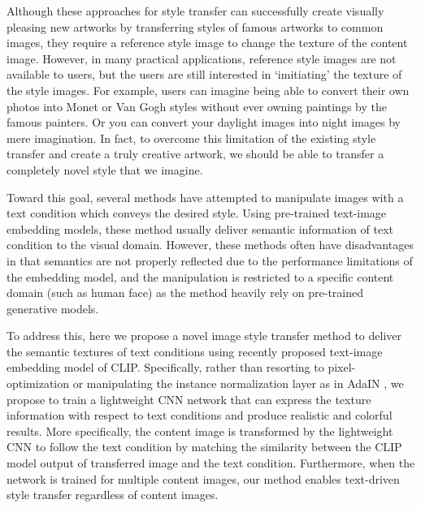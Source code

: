 \documentclass[10pt,twocolumn,letterpaper]{article}
\begin{document}
Although these approaches for style transfer can successfully create visually pleasing new artworks by transferring styles of famous artworks to common images,
they require a reference style image to change the texture of the content image. 
However, in many practical applications, reference style images are not available to users, but the users are still interested in `imitiating' the texture of the style images.
For example, users can imagine being able to convert their own photos into Monet or Van Gogh styles without ever owning paintings by the famous painters.
Or you can convert your daylight images into night images by mere imagination.
In fact,  to overcome this limitation of the existing style transfer and create a truly creative artwork, we should be able to transfer a completely novel style that we imagine.


Toward this goal, several methods have attempted to manipulate images with a text condition which conveys the desired style. Using pre-trained text-image embedding models, 
these method usually deliver semantic information of text condition  to the visual domain. However, these methods often have disadvantages in that semantics are not properly reflected due to the performance limitations of the embedding model\cite{zhang1,zhang2}, and the manipulation
is restricted to a specific content domain (such as human face) as the method heavily rely on pre-trained generative models\cite{styleclip}.

To address this, here we propose a novel image style transfer method to deliver the semantic textures of text conditions using recently proposed text-image embedding model of CLIP\cite{clip}. 
Specifically, rather than resorting to pixel-optimization or manipulating the instance normalization layer as in AdaIN \cite{adain},
we propose to train a lightweight CNN network that can express the texture information with respect to text conditions and produce realistic and colorful results. 
More specifically,  the content image is transformed by the lightweight CNN to follow the text condition by matching the similarity 
between the CLIP model output of transferred image and the text condition. 
Furthermore, when the network is trained for multiple content images,
our method enables text-driven style transfer regardless of content images.
\end{document}
